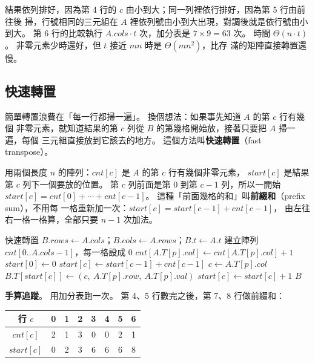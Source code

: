 結果依列排好，因為第 4 行的 $c$ 由小到大；同一列裡依行排好，因為第 5 行由前往後
掃，行號相同的三元組在 $A$ 裡依列號由小到大出現，對調後就是依行號由小到大。 第 6
行的比較執行 $A.\mathit{cols} \cdot t$ 次，加分表是 $7 \times 9 = 63$ 次。 時間
$\Theta(n \cdot t)$。 非零元素少時還好，但 $t$ 接近 $mn$ 時是 $\Theta(mn^2)$，比存
滿的矩陣直接轉置還慢。

\subsection{快速轉置}

簡單轉置浪費在「每一行都掃一遍」。 換個想法：如果事先知道 $A$ 的第 $c$ 行有幾個
非零元素，就知道結果的第 $c$ 列從 $B$ 的第幾格開始放，接著只要把 $A$ 掃一遍，每個
三元組直接放到它該去的地方。 這個方法叫\textbf{快速轉置}（fast transpose）。

用兩個長度 $n$ 的陣列：$\mathit{cnt}[c]$ 是 $A$ 的第 $c$ 行有幾個非零元素，
$\mathit{start}[c]$ 是結果第 $c$ 列下一個要放的位置。 第 $c$ 列前面是第 $0$ 到第
$c - 1$ 列，所以一開始 $\mathit{start}[c] = \mathit{cnt}[0] + \cdots +
\mathit{cnt}[c - 1]$。 這種「前面幾格的和」叫\textbf{前綴和}（prefix sum），不用每
一格重新加一次：$\mathit{start}[c] = \mathit{start}[c - 1] + \mathit{cnt}[c - 1]$，
由左往右一格一格算，全部只要 $n - 1$ 次加法。

\begin{pseudo}[label=alg:arr-fast-transpose]{快速轉置}
    \State $B.\mathit{rows} \gets A.\mathit{cols}$；$B.\mathit{cols} \gets A.\mathit{rows}$；$B.t \gets A.t$
    \State 建立陣列 $\mathit{cnt}[0..A.\mathit{cols} - 1]$，每一格設成 $0$
        \State $\mathit{cnt}[A.T[p].\mathit{col}] \gets \mathit{cnt}[A.T[p].\mathit{col}] + 1$
    \EndFor
    \State $\mathit{start}[0] \gets 0$
        \State $\mathit{start}[c] \gets \mathit{start}[c - 1] + \mathit{cnt}[c - 1]$
    \EndFor
        \State $c \gets A.T[p].\mathit{col}$
        \State $B.T[\mathit{start}[c]] \gets (c,\ A.T[p].\mathit{row},\ A.T[p].\mathit{val})$
        \State $\mathit{start}[c] \gets \mathit{start}[c] + 1$
    \EndFor
    \State \Return $B$
\EndFunction
\end{pseudo}

\textbf{手算追蹤}。 用加分表跑一次。 第 4、5 行數完之後，第 7、8 行做前綴和：

\begin{center}
\begin{tabular}{c|ccccccc}
\toprule
行 $c$ & 0 & 1 & 2 & 3 & 4 & 5 & 6 \\
\midrule
$\mathit{cnt}[c]$ & 2 & 1 & 3 & 0 & 0 & 2 & 1 \\
$\mathit{start}[c]$ & 0 & 2 & 3 & 6 & 6 & 6 & 8 \\
\bottomrule
\end{tabular}
\end{center}

